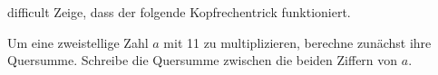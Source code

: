 \documentclass[../variablen.tex]{subfiles}
\begin{document}
\begin{exercise}{difficult}
    Zeige, dass der folgende Kopfrechentrick funktioniert.

    Um eine zweistellige Zahl $a$ mit 11 zu multiplizieren, berechne zunächst ihre Quersumme. Schreibe die Quersumme zwischen die beiden Ziffern von $a$.
\end{exercise}
\end{document}
